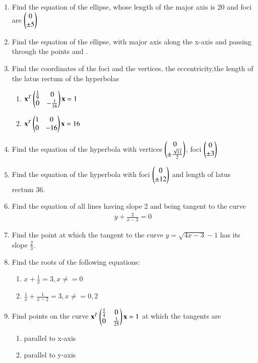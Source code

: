 \begin{enumerate}[label=\arabic*.,ref=\thesubsection.\theenumi]
%
\item Find the equation of the ellipse, whose length of the major axis is 20 and foci are $\begin{pmatrix}0\\ \pm 5\end{pmatrix}$
%
\item Find the equation of the ellipse, with major axis along the x-axis and passing through the points  and .
%
\item Find the coordinates of the foci and the vertices, the eccentricity,the length of the latus rectum of the hyperbolas
\begin{enumerate}
\item 
$
\mathbf{x}^T\begin{pmatrix}\frac{1}{9} & 0 \\ 0 & -\frac{1}{16}\end{pmatrix}\mathbf{x} = 1
$
\item 
$
\mathbf{x}^T\begin{pmatrix}1 & 0 \\ 0 & -16\end{pmatrix}\mathbf{x} = 16
$
\end{enumerate}
\item Find the equation of the hyperbola with  vertices $\begin{pmatrix}0 \\ \pm \frac{\sqrt{11}}{2}\end{pmatrix}$, foci $\begin{pmatrix} 0\\ \pm 3\end{pmatrix}$
\item Find the equation of the hyperbola with   foci $\begin{pmatrix} 0\\ \pm 12\end{pmatrix}$ and length of latus rectum 36.
%
\item Find the equation of all lines having slope 2 and being tangent to the curve
\begin{align}
y + \frac{2}{x-3} = 0
\end{align}
%
\item Find the point at which the tangent to the curve $y = \sqrt{4x-3}-1$ has its 
slope $\frac{2}{3}$.
%
\item Find the roots of the following equations:
\begin{enumerate}
\item  $x + \frac{1}{x} = 3, x \ne =0 $
\item  $ \frac{1}{x} + \frac{1}{x-2}=3, x\ne =0, 2 $
\end{enumerate}
%
\item Find points on the curve 
$
\mathbf{x}^T\begin{pmatrix}\frac{1}{4} & 0 \\ 0 & \frac{1}{25}\end{pmatrix}\mathbf{x} = 1
$
at which the tangents are 
\begin{enumerate}
\item parallel to x-axis
\item parallel to y-axis

\end{enumerate}
\end{enumerate}
